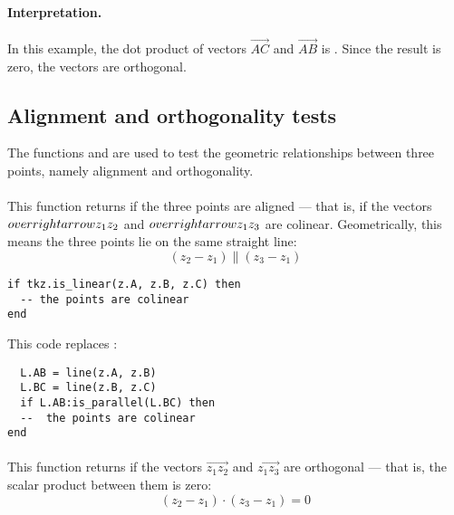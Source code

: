 \paragraph{Interpretation.}
In this example, the dot product of vectors $\overrightarrow{AC}$ and $\overrightarrow{AB}$ is . Since the result is zero, the vectors are orthogonal.

%

\subsection{Alignment and orthogonality tests}
\label{sub:alignment_or_orthogonality}

The functions  and  are used to test the geometric relationships between three points, namely alignment and orthogonality.

\paragraph{}
This function returns  if the three points are aligned — that is, if the vectors $\\overrightarrow{z_1z_2}$ and $\\overrightarrow{z_1z_3}$ are colinear. Geometrically, this means the three points lie on the same straight line:
\[
(z_2 - z_1) \parallel (z_3 - z_1)
\]

\begin{mybox}
\begin{verbatim}
if tkz.is_linear(z.A, z.B, z.C) then
  -- the points are colinear
end
\end{verbatim}
\end{mybox}

This code replaces :

\begin{mybox}
\begin{verbatim}
  L.AB = line(z.A, z.B)
  L.BC = line(z.B, z.C)
  if L.AB:is_parallel(L.BC) then
  --  the points are colinear
end
\end{verbatim}
\end{mybox}

\paragraph{}
This function returns  if the vectors $\overrightarrow{z_1z_2}$ and $\overrightarrow{z_1z_3}$ are orthogonal — that is, the scalar product between them is zero:
\[
(z_2 - z_1) \cdot (z_3 - z_1) = 0
\]

